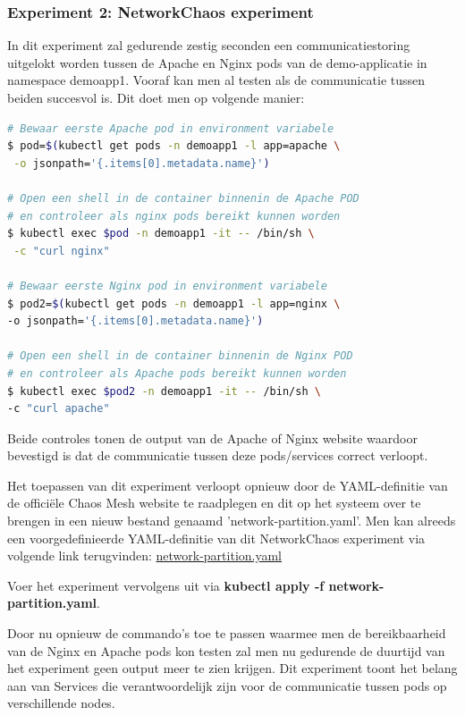 \subsubsection{Experiment 2: NetworkChaos experiment}

In dit experiment zal gedurende zestig seconden een communicatiestoring uitgelokt worden tussen de Apache en Nginx pods van de demo-applicatie in namespace demoapp1. Vooraf kan men al testen als de communicatie tussen beiden succesvol is. Dit doet men op volgende manier: 
\begin{lstlisting}[language=bash]
# Bewaar eerste Apache pod in environment variabele
$ pod=$(kubectl get pods -n demoapp1 -l app=apache \
 -o jsonpath='{.items[0].metadata.name}')

# Open een shell in de container binnenin de Apache POD
# en controleer als nginx pods bereikt kunnen worden
$ kubectl exec $pod -n demoapp1 -it -- /bin/sh \
 -c "curl nginx"
 
# Bewaar eerste Nginx pod in environment variabele
$ pod2=$(kubectl get pods -n demoapp1 -l app=nginx \
-o jsonpath='{.items[0].metadata.name}')

# Open een shell in de container binnenin de Nginx POD
# en controleer als Apache pods bereikt kunnen worden
$ kubectl exec $pod2 -n demoapp1 -it -- /bin/sh \
-c "curl apache"
\end{lstlisting}

Beide controles tonen de output van de Apache of Nginx website waardoor bevestigd is dat de communicatie tussen deze pods/services correct verloopt. 

Het toepassen van dit experiment verloopt opnieuw door de YAML-definitie van de officiële Chaos Mesh website te raadplegen en dit op het systeem over te brengen in een nieuw bestand genaamd 'network-partition.yaml'.
\newline Men kan alreeds een voorgedefinieerde YAML-definitie van dit NetworkChaos experiment via volgende link terugvinden: \href{https://github.com/KenBruggeman/BP\textunderscore 21-22/blob/master/bachelorproef/docs/chaosmesh%20experimenten/network-partition.yaml}{network-partition.yaml}

Voer het experiment vervolgens uit via {\bf kubectl apply -f network-partition.yaml}. 

Door nu opnieuw de commando's toe te passen waarmee men de bereikbaarheid van de Nginx en Apache pods kon testen zal men nu gedurende de duurtijd van het experiment geen output meer te zien krijgen. Dit experiment toont het belang aan van Services die verantwoordelijk zijn voor de communicatie tussen pods op verschillende nodes.
  
